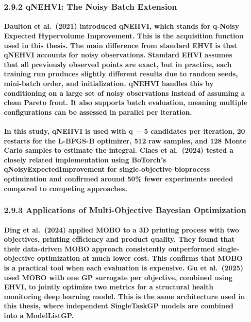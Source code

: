 \subsubsection{2.9.2 qNEHVI: The Noisy Batch
Extension}\label{qnehvi-the-noisy-batch-extension}

\paragraph{Daulton et al. (2021) introduced qNEHVI, which stands for q-Noisy Expected Hypervolume Improvement. This is the acquisition function used in this thesis. The main difference from standard EHVI is that qNEHVI accounts for noisy observations. Standard EHVI assumes that all previously observed points are exact, but in practice, each training run produces slightly different results due to random seeds, mini-batch order, and initialization. qNEHVI handles this by conditioning on a large set of noisy observations instead of assuming a clean Pareto front. It also supports batch evaluation, meaning multiple configurations can be assessed in parallel per iteration.}

\paragraph{In this study, qNEHVI is used with q = 5 candidates per iteration, 20 restarts for the L-BFGS-B optimizer, 512 raw samples, and 128 Monte Carlo samples to estimate the integral. Claes et al. (2024) tested a closely related implementation using BoTorch’s qNoisyExpectedImprovement for single-objective bioprocess optimization and confirmed around 50\% fewer experiments needed compared to competing approaches.}

\subsubsection{2.9.3 Applications of Multi-Objective Bayesian
Optimization}\label{applications-of-multi-objective-bayesian-optimization}

\paragraph{Ding et al. (2024) applied MOBO to a 3D printing process with two objectives, printing efficiency and product quality. They found that their data-driven MOBO approach consistently outperformed single-objective optimization at much lower cost. This confirms that MOBO is a practical tool when each evaluation is expensive. Gu et al. (2025) used MOBO with one GP surrogate per objective, combined using EHVI, to jointly optimize two metrics for a structural health monitoring deep learning model. This is the same architecture used in this thesis, where independent SingleTaskGP models are combined into a ModelListGP.}

